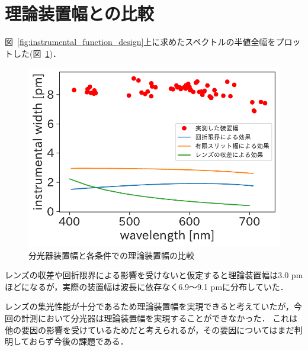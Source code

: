 \section{理論装置幅との比較}
図\ \ref{fig:instrumental_function_design}上に求めたスペクトルの半値全幅をプロットした(図\ \ref{fig:instrumental_function2})．
\begin{figure}[htbp]
    \centering
    \includegraphics[scale=0.7]{figure/instrumental_function2.pdf}
    \caption{分光器装置幅と各条件での理論装置幅の比較}
    \label{fig:instrumental_function2}
\end{figure}
レンズの収差や回折限界による影響を受けないと仮定すると理論装置幅は3.0 pmほどになるが，実際の装置幅は波長に依存なく6.9～9.1 pmに分布していた．

レンズの集光性能が十分であるため理論装置幅を実現できると考えていたが，今回の計測において分光器は理論装置幅を実現することができなかった．
これは他の要因の影響を受けているためだと考えられるが，その要因についてはまだ判明しておらず今後の課題である．